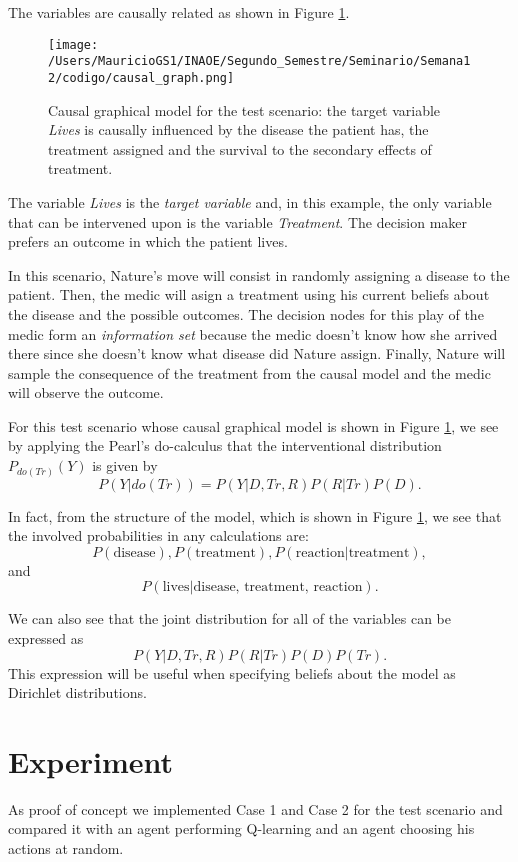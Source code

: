 \documentclass{article}
\begin{document}
The variables are causally related as shown in Figure \ref{causal_model}.

\begin{figure}[ht]
\vskip 0.2in
\begin{center}
\centerline{\texttt{[image: /Users/MauricioGS1/INAOE/Segundo\_Semestre/Seminario/Semana12/codigo/causal\_graph.png]}}
\caption{Causal graphical model for the test scenario: the target variable \textit{Lives} is causally influenced by the disease the patient has, the treatment assigned and the survival to the secondary effects of treatment.}
\label{causal_model}
\end{center}
\vskip -0.2in
\end{figure}

The variable \textit{Lives} is the \textit{target variable} and, in this example, the only variable that can be intervened upon is the variable \textit{Treatment}. The decision maker prefers an outcome in which the patient lives.

In this scenario, Nature's move will consist in randomly assigning a disease to the patient. Then, the medic will asign a treatment using his current beliefs about the disease and the possible outcomes. The decision nodes for this play of the medic form an \textit{information set} because the medic doesn't know how she arrived there since she doesn't know what disease did Nature assign. Finally, Nature will sample the consequence of the treatment from the causal model and the medic will observe the outcome.

For this test scenario whose causal graphical model is shown in Figure \ref{causal_model}, we see  by applying the Pearl's do-calculus that the interventional distribution $P_{do(Tr)}(Y)$ is given by
\[ P(Y | do(Tr))=P(Y | D, Tr, R)P(R | Tr) P(D). \]

In fact, from the structure of the model, which is shown in Figure \ref{causal_model}, we see that the involved probabilities in any calculations are:
\[ P(\textrm{disease}), P(\textrm{treatment}), P(\textrm{reaction} | \textrm{treatment}), \]
and
\[P(\textrm{lives} | \textrm{disease, treatment, reaction}). \]

We can also see that the joint distribution for all of the variables can be expressed as
\[ P(Y | D, Tr, R)P(R | Tr) P(D)P(Tr). \]
This expression will be useful when specifying beliefs about the model as Dirichlet distributions.
\section{Experiment}
As proof of concept we implemented  Case 1 and Case 2 for the test scenario and compared it with an agent performing Q-learning and an agent choosing his actions at random. 
\end{document}
